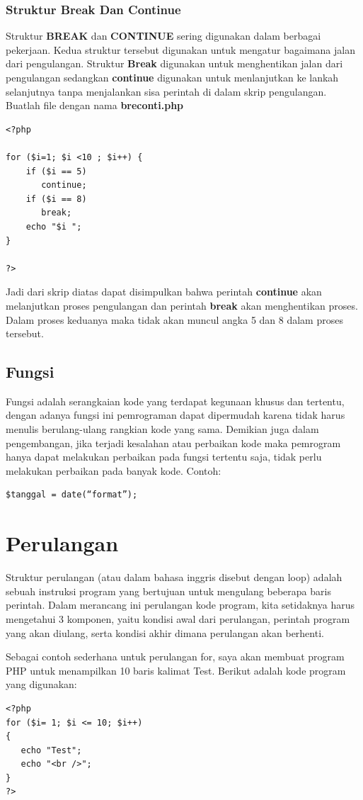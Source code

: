 \subsubsection{Struktur Break Dan Continue}
Struktur \textbf{BREAK} dan \textbf{CONTINUE} sering digunakan dalam berbagai pekerjaan. Kedua struktur tersebut digunakan untuk mengatur bagaimana jalan dari pengulangan. Struktur \textbf{Break} digunakan untuk menghentikan jalan dari pengulangan sedangkan \textbf{continue} digunakan untuk menlanjutkan ke lankah selanjutnya tanpa menjalankan sisa perintah di dalam skrip pengulangan. Buatlah file dengan nama \textbf{breconti.php}
\begin{lstlisting}
<?php
 
for ($i=1; $i <10 ; $i++) {
    if ($i == 5)
       continue;
    if ($i == 8)
       break;
    echo "$i ";
}
 
?>
\end{lstlisting}
Jadi dari skrip diatas dapat disimpulkan bahwa perintah  \textbf{continue} akan melanjutkan proses pengulangan dan perintah \textbf{break} akan menghentikan proses. Dalam proses keduanya maka tidak akan muncul angka 5 dan 8 dalam proses tersebut.
\subsection{Fungsi}
Fungsi adalah serangkaian kode yang terdapat kegunaan khusus dan tertentu, dengan adanya fungsi ini pemrograman dapat dipermudah karena tidak harus menulis berulang-ulang rangkian kode yang sama. Demikian juga dalam pengembangan, jika terjadi kesalahan atau perbaikan kode maka pemrogram hanya dapat melakukan perbaikan pada fungsi tertentu saja, tidak perlu melakukan perbaikan pada banyak kode. Contoh:
\begin{lstlisting}
$tanggal = date(“format”);
\end{lstlisting}

\section{Perulangan}
Struktur perulangan (atau dalam bahasa inggris disebut dengan loop) adalah sebuah instruksi program yang bertujuan untuk mengulang beberapa baris perintah. Dalam merancang ini perulangan kode program, kita setidaknya harus mengetahui 3 komponen, yaitu kondisi awal dari perulangan, perintah program yang akan diulang, serta kondisi akhir dimana perulangan akan berhenti.
\par
Sebagai contoh sederhana untuk perulangan for, saya akan membuat program PHP untuk menampilkan 10 baris kalimat Test. Berikut adalah kode program yang digunakan:
\begin{lstlisting}
<?php
for ($i= 1; $i <= 10; $i++)
{
   echo "Test";
   echo "<br />";
}
?>
\end{lstlisting}

